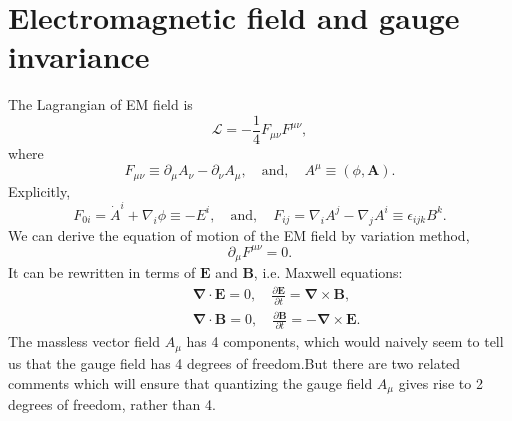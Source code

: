\section{Electromagnetic field and gauge invariance}
The Lagrangian of EM field is
\[\mathcal{L} = -\frac{1}{4}F_{\mu\nu}F^{\mu\nu},\]
where
\[F_{\mu\nu} \equiv \partial_{\mu} A_{\nu} - \partial_{\nu} A_{\mu} , \quad \mbox{and} , \quad A^{\mu} \equiv (\phi,\bm{A}).\]
Explicitly,
\[F_{0i} = \dot{A}^i + \nabla_i \phi \equiv -E^i , \quad \mbox{and} , \quad F_{ij} = \nabla_i A^j - \nabla_j A^i \equiv \epsilon_{ijk}B^k.\]
We can derive the equation of motion of the EM field by variation method,
\[\partial_{\mu}F^{\mu \nu} = 0.\]
It can be rewritten in terms of $\bm{E}$ and $\bm{B}$, i.e. Maxwell equations:
\begin{eqnarray}
&\phantom{=}&\bm{\nabla} \cdot \bm{E} = 0 , \quad \frac{\partial \bm{E}}{\partial t} = \bm{\nabla} \times \bm{B} ,\nonumber \\
&\phantom{=}& \bm{\nabla} \cdot \bm{B} = 0  , \quad \frac{\partial \bm{B}}{\partial t} = - \bm{\nabla} \times \bm{E}.\nonumber
\end{eqnarray}
The massless vector field $A_{\mu}$ has 4 components, which would naively seem to tell us that the gauge field has 4 degrees of freedom.But there are two related comments which will ensure that quantizing the gauge field $A_{\mu}$ gives rise to 2 degrees of freedom, rather than 4.
